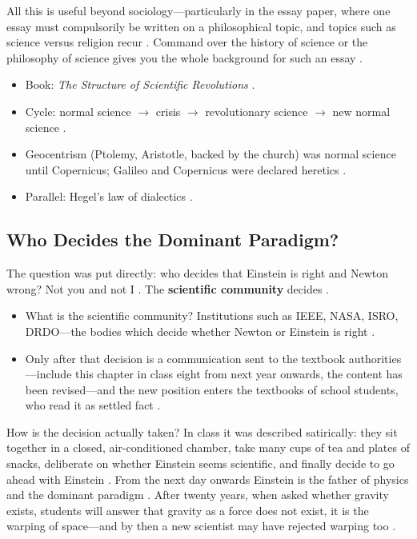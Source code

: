 \begin{PYQLink}
All this is useful beyond sociology---particularly in the essay paper, where one essay must compulsorily be written on a philosophical topic, and topics such as science versus religion recur . Command over the history of science or the philosophy of science gives you the whole background for such an essay .
\end{PYQLink}

\begin{QuickRevision}
\begin{itemize}
    \item Book: \textit{The Structure of Scientific Revolutions} .
    \item Cycle: normal science $\rightarrow$ crisis $\rightarrow$ revolutionary science $\rightarrow$ new normal science .
    \item Geocentrism (Ptolemy, Aristotle, backed by the church) was normal science until Copernicus; Galileo and Copernicus were declared heretics .
    \item Parallel: Hegel's law of dialectics .
\end{itemize}
\end{QuickRevision}

\subsection{Who Decides the Dominant Paradigm?}
The question was put directly: who decides that Einstein is right and Newton wrong? Not you and not I . The \textbf{scientific community} decides .
\begin{itemize}
    \item What is the scientific community? Institutions such as IEEE, NASA, ISRO, DRDO---the bodies which decide whether Newton or Einstein is right .
    \item Only after that decision is a communication sent to the textbook authorities---include this chapter in class eight from next year onwards, the content has been revised---and the new position enters the textbooks of school students, who read it as settled fact .
\end{itemize}

\begin{CriticalPoint}
How is the decision actually taken? In class it was described satirically: they sit together in a closed, air-conditioned chamber, take many cups of tea and plates of snacks, deliberate on whether Einstein seems scientific, and finally decide to go ahead with Einstein . From the next day onwards Einstein is the father of physics and the dominant paradigm . After twenty years, when asked whether gravity exists, students will answer that gravity as a force does not exist, it is the warping of space---and by then a new scientist may have rejected warping too .
\end{CriticalPoint}

